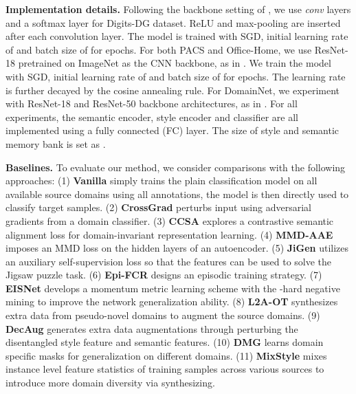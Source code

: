 \documentclass[10pt,twocolumn,letterpaper]{article}
\newcommand{\0}{{\bf 0}}
\begin{document}
\textbf{Implementation details.} Following the backbone setting of \cite{zhou2020learning}, we use  \textit{conv} layers and a softmax layer for Digits-DG dataset. ReLU and  max-pooling are inserted after each convolution layer. The model is trained with SGD, initial learning rate of  and batch size of  for  epochs. For both PACS and Office-Home, we use ResNet-18 pretrained on ImageNet as the CNN backbone, as in \cite{zhou2020learning, zhou2021domain}. We train the model with SGD, initial learning rate of  and batch size of  for  epochs. The learning rate is further decayed by the cosine annealing rule. For DomainNet, we experiment with ResNet-18 and ResNet-50 backbone architectures, as in \cite{chattopadhyay2020learning}. For all experiments, the semantic encoder, style encoder and classifier are all implemented using a fully connected (FC) layer. The size of style and semantic memory bank is set as .

\textbf{Baselines.} To evaluate our method, we consider comparisons with the following approaches: (1) \textbf{Vanilla} simply trains the plain classification model on all available source domains using all annotations, the model is then directly used to classify target samples. (2) \textbf{CrossGrad} \cite{shankar2018generalizing} perturbs input using adversarial gradients from a domain classifier. (3) \textbf{CCSA} \cite{motiian2017unified} explores a contrastive semantic alignment loss for domain-invariant representation learning. (4) \textbf{MMD-AAE} \cite{li2018domain} imposes an MMD loss on the hidden layers of an autoencoder. (5) \textbf{JiGen} \cite{carlucci2019domain} utilizes an auxiliary self-supervision loss so that the features can be used to solve the Jigsaw puzzle task. (6) \textbf{Epi-FCR} \cite{li2019episodic} designs an episodic training strategy. (7) \textbf{EISNet} \cite{wang2020learning} develops a momentum metric learning scheme with the -hard negative mining to improve the network generalization ability.  (8) \textbf{L2A-OT} \cite{zhou2020learning} synthesizes extra data from pseudo-novel domains to augment the source domains. (9) \textbf{DecAug} \cite{bai2020decaug} generates extra data augmentations through perturbing the disentangled style feature and semantic features. (10) \textbf{DMG} \cite{chattopadhyay2020learning} learns domain specific masks for generalization on different domains. (11) \textbf{MixStyle} \cite{zhou2021domain} mixes instance level feature statistics of training samples across various sources to introduce more domain diversity via synthesizing.
\end{document}

